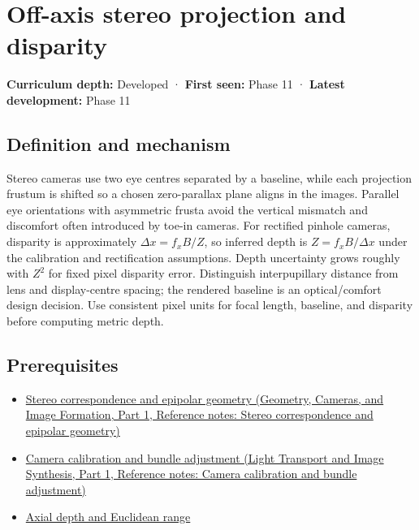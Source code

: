 \hypertarget{appendix-0976e86e5b9f}{}\label{referencestart:appendix-0976e86e5b9f}
\section{Off-axis stereo projection and disparity}\label{appendix-0976e86e5b9f-off-axis-stereo-projection-and-disparity}

\hypertarget{appendix-0976e86e5b9f-off-axis-stereo-projection-and-disparity}{}

\textbf{Curriculum depth:} Developed · \textbf{First seen:} Phase 11 · \textbf{Latest development:} Phase 11

\begin{allmightroledefinition}

\subsection{Definition and mechanism}\label{appendix-0976e86e5b9f-definition-and-mechanism}

\hypertarget{appendix-0976e86e5b9f-definition-and-mechanism}{}

Stereo cameras use two eye centres separated by a baseline, while each projection frustum is shifted so a chosen zero-parallax plane aligns in the images. Parallel eye orientations with asymmetric frusta avoid the vertical mismatch and discomfort often introduced by toe-in cameras. For rectified pinhole cameras, disparity is approximately \(\Delta x=f_xB/Z\), so inferred depth is \(Z=f_xB/\Delta x\) under the calibration and rectification assumptions. Depth uncertainty grows roughly with \(Z^2\) for fixed pixel disparity error. Distinguish interpupillary distance from lens and display-centre spacing; the rendered baseline is an optical/comfort design decision. Use consistent pixel units for focal length, baseline, and disparity before computing metric depth.

\end{allmightroledefinition}

\subsection{Prerequisites}\label{appendix-0976e86e5b9f-prerequisites}

\hypertarget{appendix-0976e86e5b9f-prerequisites}{}

\begin{itemize}
\tightlist
\item
  \href{../03-Geometry-Cameras-and-Image-Formation-P01/main.pdf\#appendix-c4e98b6e4001}{Stereo correspondence and epipolar geometry (Geometry, Cameras, and Image Formation, Part 1, Reference notes: Stereo correspondence and epipolar geometry)}
\item
  \href{../04-Light-Transport-and-Image-Synthesis-P01/main.pdf\#appendix-3ee9861904d5}{Camera calibration and bundle adjustment (Light Transport and Image Synthesis, Part 1, Reference notes: Camera calibration and bundle adjustment)}
\item
  \hyperref[appendix-cac01ebeeb11]{Axial depth and Euclidean range}
\end{itemize}

